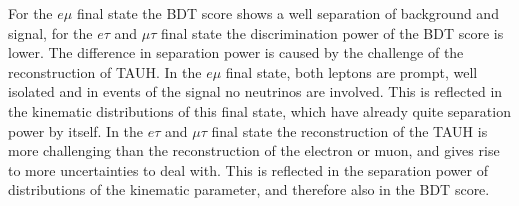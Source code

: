For the $e\mu$ final state the \gls{BDT} score shows a well separation of background and signal, for the $e\tau$ and $\mu\tau$ final state the discrimination power of the \gls{BDT} score is lower. The difference in separation power is caused by the challenge of the reconstruction of \gls{TAUH}. In the $e\mu$ final state, both leptons are prompt, well isolated and in events of the signal no neutrinos are involved. This is reflected in the kinematic distributions of this final state, which have already quite separation power by itself. In the $e\tau$ and $\mu\tau$ final state the reconstruction of the \gls{TAUH} is more challenging than the reconstruction of the electron or muon, and gives rise to more uncertainties to deal with. This is reflected in the separation power of distributions of the kinematic parameter, and therefore also in the \gls{BDT} score. 










	

































